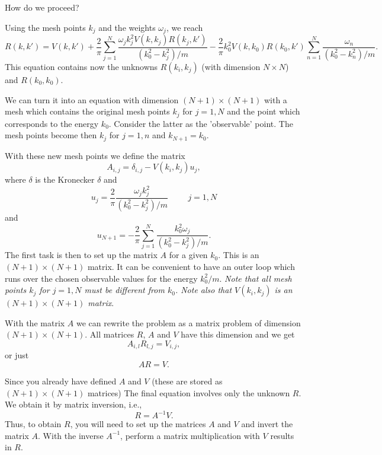 \documentclass[%
twoside,                 %
final,                   %
10pt]{article}
\newenvironment{doconceexercise}{}{}
\begin{document}
\begin{doconceexercise}
How do we proceed?

Using the mesh points $k_j$ and the weights $\omega_j$, we reach
\[
          R(k,k') = V(k,k') +\frac{2}{\pi}
          \sum_{j=1}^N\frac{\omega_jk_j^2V(k,k_j)R(k_j,k')}
                           {(k_0^2-k_j^2)/m}
           -\frac{2}{\pi}k_0^2V(k,k_0)R(k_0,k')
          \sum_{n=1}^N\frac{\omega_n}
                           {(k_0^2-k_n^2)/m}.                
\]
This equation contains now the unknowns $R(k_i,k_j)$
(with dimension $N\times N$) and $R(k_0,k_0)$.

We can turn it into an equation
with dimension $(N+1)\times (N+1)$ with  a mesh
which contains the original mesh points $k_j$ for $j=1,N$
and the point which corresponds to the energy $k_0$.
Consider the latter as the 'observable' point.
The mesh points become then $k_j$ for $j=1,n$ and
$k_{N+1}=k_0$. 

With these new mesh points we define the matrix
\begin{equation}
      A_{i,j}=\delta_{i,j}-V(k_i,k_j)u_j,
      \label{eq:aeq}
\end{equation}
where $\delta$ is the Kronecker $\delta$
and
\[
     u_j=\frac{2}{\pi}\frac{\omega_jk_j^2}{(k_0^2-k_j^2)/m}\hspace{1cm} j=1,N
\]
and
\[
     u_{N+1}=-\frac{2}{\pi}\sum_{j=1}^N\frac{k_0^2\omega_j}{(k_0^2-k_j^2)/m}.
\]
The first task is then to 
set up the matrix $A$ for a given $k_0$. This is an
$(N+1)\times (N+1)$ matrix. It can be convenient
to have an outer loop which runs over the chosen
observable values for the energy $k_0^2/m$.
\emph{Note that all mesh points $k_j$ for $j=1,N$ must be different from $k_0$. Note also that $V(k_i,k_j)$ is an $(N+1)\times (N+1)$ matrix}. 

With the matrix $A$ we can rewrite the problem as a matrix problem of dimension $(N+1)\times (N+1)$.
All matrices $R$, $A$ and $V$ have this dimension and we get
\[
    A_{i,l}R_{l,j}=V_{i,j},
\] 
or just
\[
    AR=V.
\] 

Since you already have defined $A$ and $V$
(these are stored as $(N+1)\times (N+1)$ matrices) 
The final equation involves only the unknown
$R$. We obtain it by matrix inversion, i.e.,
\begin{equation}
    R=A^{-1}V.
    \label{eq:final2}
\end{equation}
Thus, to obtain $R$, you will need to set up the matrices
$A$ and $V$ and invert the matrix $A$. 
With the inverse $A^{-1}$, perform
a matrix multiplication with $V$ results in $R$.


\end{doconceexercise}
\end{document}
